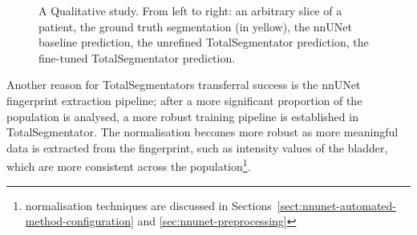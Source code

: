 \documentclass[11pt,twoside]{report}
\begin{document}
\begin{figure}[H]
  \centering
  \caption{A Qualitative study. From left to right: an arbitrary slice of a patient, the ground truth segmentation (in yellow), the nnUNet baseline prediction, the unrefined TotalSegmentator prediction, the fine-tuned TotalSegmentator prediction.}\label{fig:bladder-totalsegmentator-qualitative}
\end{figure}

\clearpage

Another reason for TotalSegmentators transferral success is the nnUNet fingerprint extraction pipeline; after a more significant proportion of the population is analysed, a more robust training pipeline is established in TotalSegmentator. The normalisation becomes more robust as more meaningful data is extracted from the fingerprint, such as intensity values of the bladder, which are more consistent across the population\footnote{normalisation techniques are discussed in Sections~\ref{sect:nnunet-automated-method-configuration} and \ref{sec:nnunet-preprocessing}}.
\end{document}
